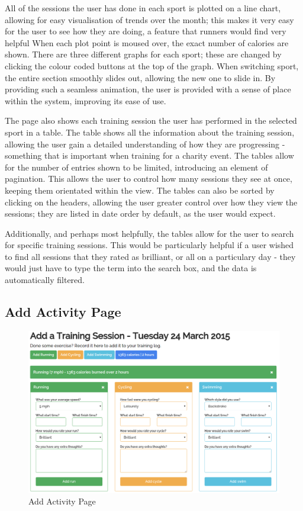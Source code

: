 \documentclass{article}[12pt,a4paper]
\begin{document}
All of the sessions the user has done in each sport is plotted on a line chart, allowing for easy visualisation of trends over the month; this makes it very easy for the user to see how they are doing, a feature that runners would find very helpful When each plot point is moused over, the exact number of calories are shown. There are three different graphs for each sport; these are changed by clicking the colour coded buttons at the top of the graph. When switching sport, the entire section smoothly slides out, allowing the new one to slide in. By providing such a seamless animation, the user is provided with a sense of place within the system, improving its ease of use.

The page also shows each training session the user has performed in the selected sport in a table. The table shows all the information about the training session, allowing the user gain a detailed understanding of how they are progressing - something that is important when training for a charity event. The tables allow for the number of entries shown to be limited, introducing an element of pagination. This allows the user to control how many sessions they see at once, keeping them orientated within the view. The tables can also be sorted by clicking on the headers, allowing the user greater control over how they view the sessions; they are listed in date order by default, as the user would expect.

Additionally, and perhaps most helpfully, the tables allow for the user to search for specific training sessions. This would be particularly helpful if a user wished to find all sessions that they rated as brilliant, or all on a particulary day - they would just have to type the term into the search box, and the data is automatically filtered.

\clearpage

\subsection{Add Activity Page}

\begin{figure}[h!]
  \includegraphics[scale=0.35]{final_ui/add_activity}
  \caption{Add Activity Page}
\end{figure}
\end{document}
